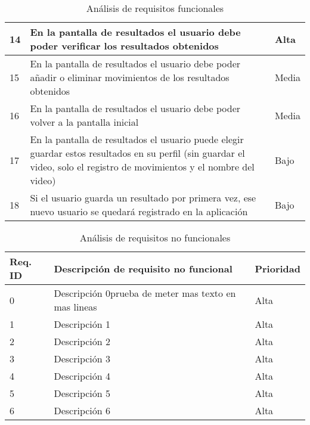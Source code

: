 \begin{table}[H]
\begin{center}
\begin{tabular}{p{} | p{} p{}}
            \hline
            14& En la pantalla de resultados el usuario debe poder verificar los resultados obtenidos & Alta\\
            \hline
            15& En la pantalla de resultados el usuario debe poder añadir o eliminar movimientos de los resultados obtenidos & Media\\
            \hline
            16& En la pantalla de resultados el usuario debe poder volver a la pantalla inicial & Media\\
            \hline
            17& En la pantalla de resultados el usuario puede elegir guardar estos resultados en su perfil (sin guardar el video, solo el registro de movimientos y el nombre del video) & Bajo\\
            \hline
            18& Si el usuario guarda un resultado por primera vez, ese nuevo usuario se quedará registrado en la aplicación  & Bajo\\
            \hline
        \end{tabular} 
    \end{center}
    \caption{Análisis de requisitos funcionales}
    \label{ReqFuncionales}
\end{table}

\begin{table}[H]
    \begin{center}
        \begin{tabular}{p{} | p{} p{}}
            Req. ID & Descripción de requisito no funcional & Prioridad\\
            \hline
            0& Descripción 0\newline prueba de meter mas texto en mas lineas & Alta\\
            \hline
            1& Descripción 1 & Alta\\
            \hline
            2& Descripción 2 & Alta\\
            \hline
            3& Descripción 3 & Alta\\
            \hline
            4& Descripción 4 & Alta\\
            \hline
            5& Descripción 5 & Alta\\
            \hline
            6& Descripción 6 & Alta\\
            \hline
        \end{tabular} 
    \end{center}
    \caption{Análisis de requisitos no funcionales}
    \label{ReqNoFuncionales}
\end{table}

